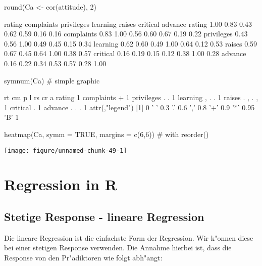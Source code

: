 \documentclass[a4paper,twoside]{tufte-book}\usepackage[]{graphicx}\usepackage[]{color}
\makeatletter
\def\maxwidth{ %
  \ifdim\Gin@nat@width>\linewidth
    \linewidth
  \else
    \Gin@nat@width
  \fi
}
\makeatother
\begin{document}
\begin{appendices}
\begin{Schunk}
\begin{Sinput}
round(Ca <- cor(attitude), 2)
\end{Sinput}
\begin{Soutput}
           rating complaints privileges learning raises critical advance
rating       1.00       0.83       0.43     0.62   0.59     0.16    0.16
complaints   0.83       1.00       0.56     0.60   0.67     0.19    0.22
privileges   0.43       0.56       1.00     0.49   0.45     0.15    0.34
learning     0.62       0.60       0.49     1.00   0.64     0.12    0.53
raises       0.59       0.67       0.45     0.64   1.00     0.38    0.57
critical     0.16       0.19       0.15     0.12   0.38     1.00    0.28
advance      0.16       0.22       0.34     0.53   0.57     0.28    1.00
\end{Soutput}
\begin{Sinput}
symnum(Ca) # simple graphic
\end{Sinput}
\begin{Soutput}
           rt cm p l rs cr a
rating     1                
complaints +  1             
privileges .  .  1          
learning   ,  .  . 1        
raises     .  ,  . , 1      
critical             .  1   
advance          . . .     1
attr(,"legend")
[1] 0 ' ' 0.3 '.' 0.6 ',' 0.8 '+' 0.9 '*' 0.95 'B' 1
\end{Soutput}
\begin{Sinput}
heatmap(Ca, symm = TRUE, margins = c(6,6)) # with reorder()
\end{Sinput}


{\centering \texttt{[image: figure/unnamed-chunk-49-1]} 

}

\end{Schunk}

\chapter{Regression in R}


\section{Stetige Response - lineare Regression}

Die lineare Regression ist die einfachste Form der Regression. Wir k"onnen diese bei einer stetigen Response verwenden. Die Annahme hierbei ist, dass die Response von den Pr"adiktoren wie folgt abh"angt:


\end{appendices}
\end{document}
